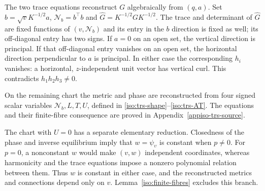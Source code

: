 \documentclass[11pt,a4paper]{article}
\numberwithin{equation}{section}
\theoremstyle{plain}
\theoremstyle{definition}
\theoremstyle{remark}
\begin{document}
The two trace equations reconstruct $G$ algebraically from $(q,a)$. Set $b=\sqrt v K^{-1/2}a$, $\mathcal N_b=b^{\top}b$ and
$\widehat G=K^{-1/2}GK^{-1/2}$.  The trace and determinant of $\widehat G$
are fixed functions of $(v,\mathcal N_b)$ and its entry in the $b$ direction is fixed
as well; its off-diagonal entry has two signs.  If $a=0$ on an open set,
the vertical direction is principal.  If that off-diagonal entry vanishes
on an open set, the horizontal direction perpendicular to $a$ is
principal.  In either case the corresponding $h_i$ vanishes:
a horizontal, $z$-independent unit vector has vertical curl.  This contradicts $h_1h_2h_3\ne0$.

On the remaining chart the metric and phase are reconstructed from
four signed scalar variables $\mathcal N_b,L,T,U$, defined in
\eqref{iso:trs-shape}--\eqref{iso:trs-AT}. The equations and their
finite-fibre consequence are proved in Appendix~\ref{appiso-trs-source}.

The chart with $U=0$ has a separate elementary reduction. Closedness
of the phase and inverse equilibrium imply that
$w=\psi_\upsilon$ is constant when $p\ne0$. For $p=0$, a nonconstant
$w$ would make $(v,w)$ independent coordinates, whereas harmonicity
and the trace equations impose a nonzero polynomial relation between
them. Thus $w$ is constant in either case, and the reconstructed
metrics and connections depend only on $v$.
Lemma~\ref{iso:finite-fibres} excludes this branch.
\end{document}
